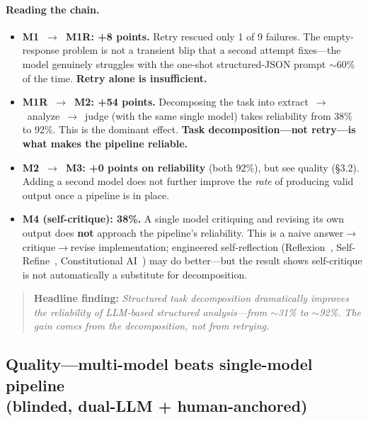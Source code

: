\documentclass[11pt]{article}
\begin{document}
\paragraph{Reading the chain.}

\begin{itemize}
  \item \textbf{M1~$\rightarrow$~M1R: +8 points.} Retry rescued only 1 of 9
        failures. The empty-response problem is not a transient blip that a
        second attempt fixes---the model genuinely struggles with the one-shot
        structured-JSON prompt $\sim$60\% of the time. \textbf{Retry alone is
        insufficient.}
  \item \textbf{M1R~$\rightarrow$~M2: +54 points.} Decomposing the task into
        extract~$\rightarrow$~analyze~$\rightarrow$~judge (with the same single
        model) takes reliability from 38\% to 92\%. This is the dominant effect.
        \textbf{Task decomposition---not retry---is what makes the pipeline
        reliable.}
  \item \textbf{M2~$\rightarrow$~M3: +0 points on reliability} (both 92\%), but
        see quality (\S3.2). Adding a second model does not further improve the
        \emph{rate} of producing valid output once a pipeline is in place.
  \item \textbf{M4 (self-critique): 38\%.} A single model critiquing and revising
        its own output does \textbf{not} approach the pipeline's reliability.
        This is a naive answer$\rightarrow$critique$\rightarrow$revise
        implementation; engineered self-reflection (Reflexion~\citep{shinn2023reflexion},
        Self-Refine~\citep{madaan2023selfrefine},
        Constitutional AI~\citep{bai2022constitutional}) may do better---but the
        result shows self-critique is not automatically a substitute for
        decomposition.
\end{itemize}

\begin{quote}
\textbf{Headline finding:} \emph{Structured task decomposition dramatically
improves the reliability of LLM-based structured analysis---from $\sim$31\% to
$\sim$92\%. The gain comes from the decomposition, not from retrying.}
\end{quote}

\subsection{Quality---multi-model beats single-model pipeline \\
            (blinded, dual-LLM + human-anchored)}
\end{document}
